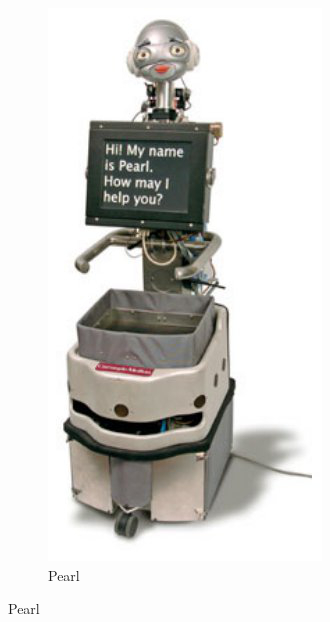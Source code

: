\begin{figure}[h]
        \centering
        \begin{subfigure}[h]{0.2\textwidth}
                \includegraphics[width=\textwidth]{./img/3/pearl}
                \caption{Pearl}

\end{subfigure}
\end{figure}
